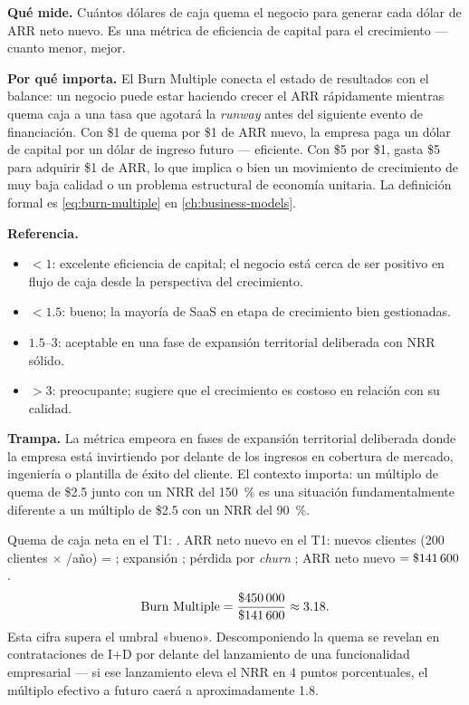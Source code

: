 \textbf{Qué mide.} Cuántos dólares de caja quema el negocio para generar cada dólar de ARR
neto nuevo. Es una métrica de eficiencia de capital para el crecimiento --- cuanto menor,
mejor.

\textbf{Por qué importa.} El Burn Multiple conecta el estado de resultados con el balance:
un negocio puede estar haciendo crecer el ARR rápidamente mientras quema caja a una tasa que
agotará la \emph{runway} antes del siguiente evento de financiación. Con \$1 de quema por
\$1 de ARR nuevo, la empresa paga un dólar de capital por un dólar de ingreso futuro ---
eficiente. Con \$5 por \$1, gasta \$5 para adquirir \$1 de ARR, lo que implica o bien un
movimiento de crecimiento de muy baja calidad o un problema estructural de economía unitaria.
La definición formal es \cref{eq:burn-multiple} en \cref{ch:business-models}.

\textbf{Referencia.}
\begin{itemize}
  \item $< 1$: excelente eficiencia de capital; el negocio está cerca de ser positivo en
    flujo de caja desde la perspectiva del crecimiento.
  \item $< 1.5$: bueno; la mayoría de SaaS en etapa de crecimiento bien gestionadas.
  \item $1.5$--$3$: aceptable en una fase de expansión territorial deliberada con NRR sólido.
  \item $> 3$: preocupante; sugiere que el crecimiento es costoso en relación con su calidad.
\end{itemize}

\textbf{Trampa.} La métrica empeora en fases de expansión territorial deliberada donde la
empresa está invirtiendo por delante de los ingresos en cobertura de mercado, ingeniería o
plantilla de éxito del cliente. El contexto importa: un múltiplo de quema de \$2.5 junto con
un NRR del \qty{150}{\percent} es una situación fundamentalmente diferente a un múltiplo de
\$2.5 con un NRR del \qty{90}{\percent}.

\begin{example}
Quema de caja neta en el T1: . ARR neto nuevo en el T1: nuevos clientes
(\num{200} clientes $\times$ /año) = ; expansión ;
pérdida por \emph{churn} ; ARR neto nuevo $= \$\num{141600}$.
\[
  \text{Burn Multiple} = \frac{\$\num{450000}}{\$\num{141600}} \approx 3.18.
\]
Esta cifra supera el umbral «bueno». Descomponiendo la quema se revelan  en
contrataciones de I+D por delante del lanzamiento de una funcionalidad empresarial --- si ese
lanzamiento eleva el NRR en 4 puntos porcentuales, el múltiplo efectivo a futuro caerá a
aproximadamente 1.8.
\end{example}


